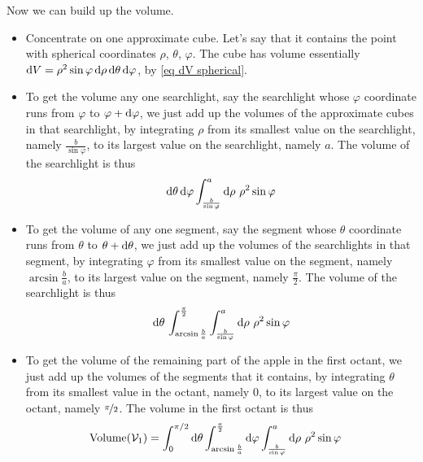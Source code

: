 \begin{eg}
Now we can build up the volume.
\begin{itemize}
\item
Concentrate on one approximate cube. Let's say that it contains the point 
with spherical coordinates $\rho$, $\theta$, $\varphi$.
The cube has volume essentially $\mathrm{d}V 
  = \rho^2\sin\varphi\,\mathrm{d}\rho\,\mathrm{d}\theta\,\mathrm{d}\varphi$,
by \eqref{eq dV spherical}.

\item
To get the volume any one searchlight, say the searchlight whose 
$\varphi$ coordinate runs from $\varphi$ to $\varphi+\mathrm{d}\varphi$, 
we just add up the volumes of the approximate cubes in that searchlight, 
by integrating $\rho$ from its smallest value on the searchlight, namely 
$\frac{b}{\sin\varphi}$, to its largest value on the searchlight, 
namely $a$. The volume of the searchlight is thus
\begin{align*}
\mathrm{d}\theta\,\mathrm{d}\varphi\int_{\frac{b}{\sin\varphi}}^a
               \mathrm{d}\rho\  \rho^2\sin\varphi
\end{align*}

\item
To get the volume of any one segment, say the segment whose $\theta$ 
coordinate runs from $\theta$ to $\theta+\mathrm{d}\theta$, we just 
add up the volumes of the searchlights in that segment, by integrating 
$\varphi$ from its smallest value on the segment, namely $\arcsin\frac{b}{a}$, 
to its largest value on the segment, namely $\frac{\pi}{2}$. 
The volume of the searchlight is thus
\begin{align*}
\mathrm{d}\theta\,\int_{\arcsin\frac{b}{a}}^{\frac{\pi}{2}} 
              \int_{\frac{b}{\sin\varphi}}^a
               \mathrm{d}\rho\  \rho^2\sin\varphi
\end{align*}

\item
To get the volume of the remaining part of the apple in the first octant, 
we just add up the volumes of the segments that it contains, by integrating 
$\theta$ from its smallest value in the octant, namely $0$, to its largest value on the octant, namely  $\nicefrac{\pi}{2}$. The volume in the 
first octant is thus
\begin{align*}
\text{Volume}(\mathcal{V}_1)
&=\int_0^{\pi/2}\mathrm{d}\theta
         \int_{\arcsin\frac{b}{a}}^{\frac{\pi}{2}} \mathrm{d}\varphi
        \int_{\frac{b}{\sin\varphi}}^{a}
               \mathrm{d}\rho\  \rho^2\sin\varphi
\end{align*}


\end{itemize}
\end{eg}
